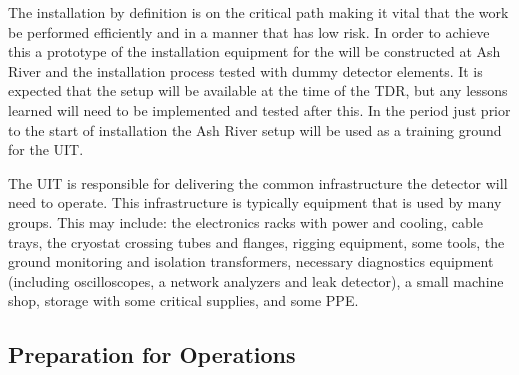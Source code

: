The installation by definition is on the critical path making it vital
that the work be performed efficiently and in a manner that has low
risk. In order to achieve this a prototype of the installation
equipment for the   will be constructed at Ash River and the installation
process tested with dummy detector elements. It is expected that the
setup will be available at the time of the TDR, but any lessons
learned will need to be implemented and tested after this. In the
period just prior to the start of installation the Ash River setup
will be used as a training ground for the UIT.

The UIT is responsible for delivering the common infrastructure
the detector will need to operate. This infrastructure is typically
equipment that is used by many groups. This may include: the
electronics racks with power and cooling, cable trays, the cryostat
crossing tubes and flanges, rigging equipment, some tools, the ground
monitoring and isolation transformers, necessary diagnostics equipment
(including oscilloscopes, a network analyzers and leak detector), a
small machine shop, storage with some critical supplies, and some PPE.




\subsection{Preparation for Operations}

